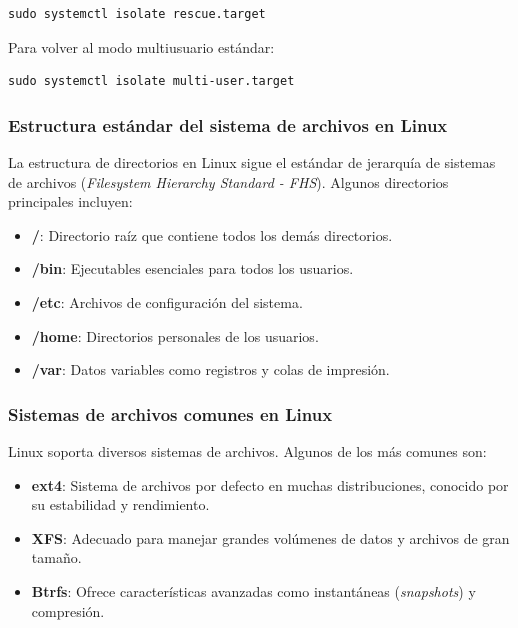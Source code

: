 \begin{lstlisting}
sudo systemctl isolate rescue.target
\end{lstlisting}

Para volver al modo multiusuario estándar:

\begin{lstlisting}
sudo systemctl isolate multi-user.target
\end{lstlisting}

\subsubsection{Estructura estándar del sistema de archivos en Linux}

La estructura de directorios en Linux sigue el estándar de jerarquía de sistemas de archivos (\textit{Filesystem Hierarchy Standard - FHS}). Algunos directorios principales incluyen:

\begin{itemize}
  \item \textbf{/}: Directorio raíz que contiene todos los demás directorios.
  \item \textbf{/bin}: Ejecutables esenciales para todos los usuarios.
  \item \textbf{/etc}: Archivos de configuración del sistema.
  \item \textbf{/home}: Directorios personales de los usuarios.
  \item \textbf{/var}: Datos variables como registros y colas de impresión.
\end{itemize}

\subsubsection{Sistemas de archivos comunes en Linux}

Linux soporta diversos sistemas de archivos. Algunos de los más comunes son:

\begin{itemize}
  \item \textbf{ext4}: Sistema de archivos por defecto en muchas distribuciones, conocido por su estabilidad y rendimiento.
  \item \textbf{XFS}: Adecuado para manejar grandes volúmenes de datos y archivos de gran tamaño.
  \item \textbf{Btrfs}: Ofrece características avanzadas como instantáneas (\textit{snapshots}) y compresión.
\end{itemize}

